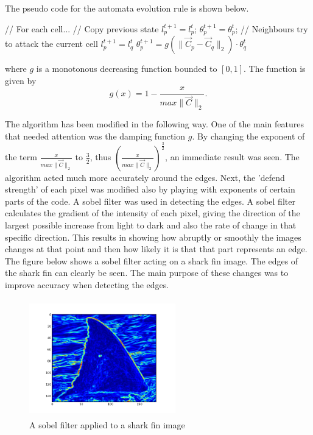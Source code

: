 \documentclass[a4paper,10pt]{article}
\begin{document}
\newpage
\noindent The pseudo code for the automata evolution rule is shown below. 
\begin{algorithm}[H]
\begin{algorithmic}[1]
 \State // For each cell...
 \State // Copy previous state
 \State $l^{t+1}_{p} = l^{t}_{p}$;
 \State $\theta_{p}^{t+1} = \theta_{p}^{t}$;
 \State // Neighbours try to attack the current cell
 \State $l^{t+1}_{p} = l^{t}_{q}$
 \State $\theta^{t+1}_{p} = g(\| \overrightarrow{C}_{p} - \overrightarrow{C}_{q} \|_{2}) \cdot \theta^{t}_{q}$
 \EndIf
 \EndFor
 \EndFor
\end{algorithmic}
\end{algorithm}

\noindent where $g$ is a monotonous decreasing function bounded to $[0, 1]$.  The function is given by
\[
g(x) = 1 - \frac{x}{max\| \overrightarrow{C} \|_{2}}. 
\]


\noindent The algorithm has been modified in the following way.  One of the main features that needed attention was the damping function $g$.  
By changing the exponent of the term $\frac{x}{max\| \overrightarrow{C} \|_{2}}$ to $\frac{3}{2}$, thus $\left ({\frac{x}{max\| \overrightarrow{C} \|_{2}}}\right ) ^\frac{3}{2}$,
an immediate result was seen.  The algorithm acted much more accurately around the edges.  Next, the 'defend strength' of each pixel was modified also by playing with exponents
of certain parts of the code.  A sobel filter was used in detecting the edges.  A sobel filter calculates the gradient of the intensity of each pixel, giving the direction of the largest possible increase from light to dark and also the rate of change in that specific direction.   This results in showing how abruptly or smoothly the images changes at that point and then how likely it is that that part represents an edge.  The figure below shows a sobel filter acting on a shark fin image.  The edges of the shark fin can clearly be seen.  The main purpose of these changes was to improve accuracy when detecting the edges.
\\
\begin{figure}[H]
 \centering
 \includegraphics[width=2.5in, height=2in]{haais}
 \caption{A sobel filter applied to a shark fin image}
 \label{fin1}
\end{figure}
\end{document}
